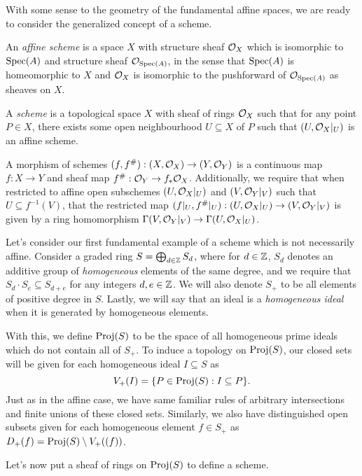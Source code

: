 With some sense to the geometry of the fundamental affine spaces,
we are ready to consider the generalized concept of a scheme.

\begin{definition}[Scheme]
    An \textit{affine scheme} is a space $X$ with structure sheaf $\mathcal{O}_X$ which is isomorphic to ${\rm Spec}(A)$ and structure sheaf $\mathcal{O}_{{\rm Spec}(A)}$,
    in the sense that ${\rm Spec}(A)$ is homeomorphic to $X$ and $\mathcal{O}_X$ is isomorphic to the pushforward of $\mathcal{O}_{{\rm Spec}(A)}$ as sheaves on $X$.

    A \textit{scheme} is a topological space $X$ with sheaf of rings $\mathcal{O}_X$ such that for any point $P \in X$,
    there exists some open neighbourhood $U \subseteq X$ of $P$ such that $(U, \mathcal{O}_X|_U)$ is an affine scheme.

    A morphism of schemes $(f, f^\#) : (X, \mathcal{O}_X) \to (Y, \mathcal{O}_Y)$ is a continuous map $f : X \to Y$ and sheaf map $f^\# : \mathcal{O}_Y \to f_*\mathcal{O}_X$.
    Additionally, we require that when restricted to affine open subschemes $(U, \mathcal{O}_X|_U)$ and $(V, \mathcal{O}_Y|_V)$ such that $U \subseteq f^{-1}(V)$,
    that the restricted map $(f|_U, f^\#|_U) : (U, \mathcal{O}_X|_U) \to (V, \mathcal{O}_Y|_V)$ is given by a ring homomorphism $\Gamma(V, \mathcal{O}_Y|_V) \to \Gamma(U, \mathcal{O}_X|_U)$.
\end{definition}

Let's consider our first fundamental example of a scheme which is not necessarily affine.
Consider a graded ring $S = \bigoplus_{d \in \mathbb{Z}} S_d$,
where for $d \in \mathbb{Z}$, $S_d$ denotes an additive group of \textit{homogeneous} elements of the same degree,
and we require that $S_d \cdot S_e \subseteq S_{d + e}$ for any integers $d,e \in \mathbb{Z}$.
We will also denote $S_+$ to be all elements of positive degree in $S$.
Lastly, we will say that an ideal is a \textit{homogeneous ideal} when it is generated by homogeneous elements.

With this, we define ${\rm Proj}(S)$ to be the space of all homogeneous prime ideals which do not contain all of $S_+$.
To induce a topology on ${\rm Proj}(S)$,
our closed sets will be given for each homogeneous ideal $I \subseteq S$ as
\[
    V_+(I) = \{ P \in {\rm Proj}(S) : I \subseteq P \}.
\]
Just as in the affine case, we have same familiar rules of arbitrary intersections and finite unions of these closed sets. 
Similarly, we also have distinguished open subsets given for each homogeneous element $f \in S_+$ as $D_+(f) = {\rm Proj}(S) \setminus V_+((f))$.

Let's now put a sheaf of rings on ${\rm Proj}(S)$ to define a scheme.

